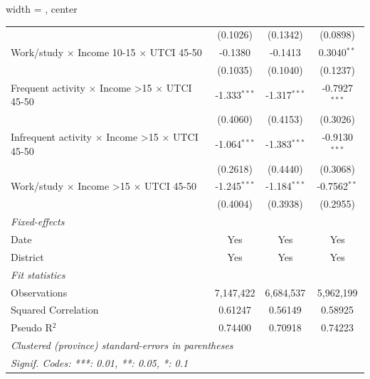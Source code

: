 \begin{table}[htbp]
\begin{adjustbox}{width = \textwidth, center}
\begin{tabular}{lccc}
                                                                         & (0.1026)                  & (0.1342)                & (0.0898)\\   
         Work/study $\times$ Income 10-15 $\times$ UTCI 45-50            & -0.1380                   & -0.1413                 & 0.3040$^{**}$\\   
                                                                         & (0.1035)                  & (0.1040)                & (0.1237)\\   
         Frequent activity $\times$ Income >15 $\times$ UTCI 45-50       & -1.333$^{***}$            & -1.317$^{***}$          & -0.7927$^{***}$\\   
                                                                         & (0.4060)                  & (0.4153)                & (0.3026)\\   
         Infrequent activity $\times$ Income >15 $\times$ UTCI 45-50     & -1.064$^{***}$            & -1.383$^{***}$          & -0.9130$^{***}$\\   
                                                                         & (0.2618)                  & (0.4440)                & (0.3068)\\   
         Work/study $\times$ Income >15 $\times$ UTCI 45-50              & -1.245$^{***}$            & -1.184$^{***}$          & -0.7562$^{**}$\\   
                                                                         & (0.4004)                  & (0.3938)                & (0.2955)\\   
         \midrule
         \emph{Fixed-effects}\\
         Date                                                            & Yes                       & Yes                     & Yes\\  
         District                                                        & Yes                       & Yes                     & Yes\\  
         \midrule
         \emph{Fit statistics}\\
         Observations                                                    & 7,147,422                 & 6,684,537               & 5,962,199\\  
         Squared Correlation                                             & 0.61247                   & 0.56149                 & 0.58925\\  
         Pseudo R$^2$                                                    & 0.74400                   & 0.70918                 & 0.74223\\  
         \midrule \midrule
         \multicolumn{4}{l}{\emph{Clustered (province) standard-errors in parentheses}}\\
         \multicolumn{4}{l}{\emph{Signif. Codes: ***: 0.01, **: 0.05, *: 0.1}}\\
      \end{tabular}
   \end{adjustbox}
\end{table}


